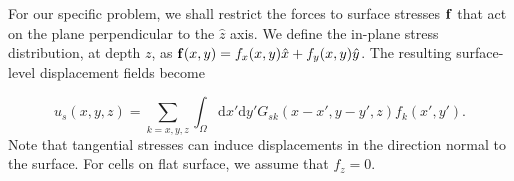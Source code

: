 \documentclass[aps,prl,reprint,twocolumn,groupedaddress,showpacs]{revtex4}
\def\dd{\mbox{d}}
\def\f{{\bf f}}
\def\r{{\bf r}}
\def\u{{\bf u}}
\def\F{{\bf F}}
\def\F{{\bf F}}
\begin{document}
%
%
%
% 
% 


For our specific problem, we shall restrict the forces to surface
stresses $\f$ that act on the plane perpendicular to the
$\hat{z}$ axis. We define the in-plane stress distribution, at depth $z$, as
$\f(x,y) = f_{x}(x,y)\hat{x} + f_{y}(x,y)\hat{y}$. 
The resulting surface-level displacement fields become

\begin{equation}
u_{s}(x,y,z) = \sum_{k=x,y,z}\int_\Omega \dd x'\dd y'G_{sk}(x-x',y-y',z)f_{k}(x',y').
\label{eq:UMODEL1s}
\end{equation}
%
Note that tangential stresses can induce
displacements in the direction normal to the surface.
For cells on flat surface, we assume that $f_{z}=0$.
\end{document}
